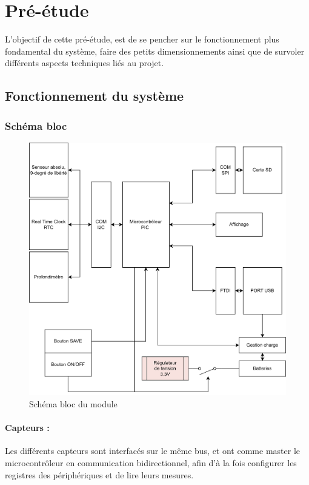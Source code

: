 \section{Pré-étude}
L'objectif de cette pré-étude, est de se pencher sur le fonctionnement plus fondamental du système, faire des petits dimensionnements ainsi que de survoler différents aspects techniques liés au projet.
\subsection{Fonctionnement du système} \label{ssec:num01}
{
\subsubsection{Schéma bloc}

\begin{figure}[h]
    \centering
    \includegraphics[width=.9\textwidth]{Figures/Schema-bloc-LocalisationSousMarin.drawio}
    \caption{Schéma bloc du module}
    \label{fig:SchemaBloc}
\end{figure}

\clearpage

\paragraph{Capteurs :} 
Les différents capteurs sont interfacés sur le même bus, et ont comme master le microcontrôleur en communication bidirectionnel, afin d'à la fois configurer les registres des périphériques et de lire leurs mesures.\\

}
